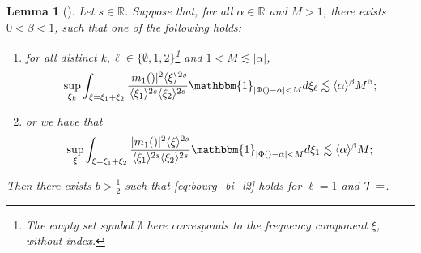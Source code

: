 \documentclass[a4paper,
11pt,  reqno]{amsart}
\makeatletter
\newcommand{\jap}[1]{\langle #1 \rangle}
\newcommand{\5}{\textup{V}}
\newtheorem{lemma}[theorem]{Lemma}
\theoremstyle{remark}
\newcommand{\R}{\mathbb{R}}
\newcommand{\TT}{\mathcal{T}}
\newcommand{\al}{\alpha}
\renewcommand{\l}{\ell}
\def\<#1>{\csname MH@symb@#1\endcsname}
\numberwithin{equation}{section}
\numberwithin{theorem}{section}
\makeatother
\begin{document}
\begin{lemma}[{\cite[Lemma 3.1]{CLS}}]\label{lem:fre_bi}
Let $s\in\R$. 
Suppose that, for all $\al\in \R$ and $M>1$, there exists $0<\beta<1$, such that one of the following holds:
\begin{enumerate}
    \item[(i)] for all distinct $ k, \l\in\{\emptyset,1,2\}$\footnote{The empty set symbol $\emptyset$ here corresponds to the frequency component $\xi$, without index.}
    and $1<M\lesssim |\alpha|$,
    \begin{equation}\label{eq:frequad}
        \sup_{\xi_k}\int_{\xi=\xi_1+\xi_2}
        \frac{|m_1(\<1>)|^2\jap{\xi}^{2s}}{\jap{\xi_{1}}^{2s}\jap{\xi_{2}}^{2s}}\mathbbm{1}_{|\Phi(\<1>)-\alpha|<M} d\xi_{\l} \lesssim \jap{\alpha}^\beta M^\beta;
    \end{equation}

    

    
    \item[(ii)] or we have that
    \begin{equation}\label{eq:frequad3}
        \sup_{\xi}\int_{\xi=\xi_1+\xi_2}\frac{|m_1(\<1>)|^2\jap{\xi}^{2s}}{\jap{\xi_{1}}^{2s}\jap{\xi_{2}}^{2s}}\mathbbm{1}_{|\Phi(\<1>)-\alpha|<M} d\xi_{1}  \lesssim \jap{\alpha}^\beta M;
    \end{equation}
\end{enumerate}
Then there exists $b>\frac12$ such that \eqref{eq:bourg_bi_l2} holds for $\ell=1$ and $\TT=\<1>$.
\end{lemma}
\end{document}
